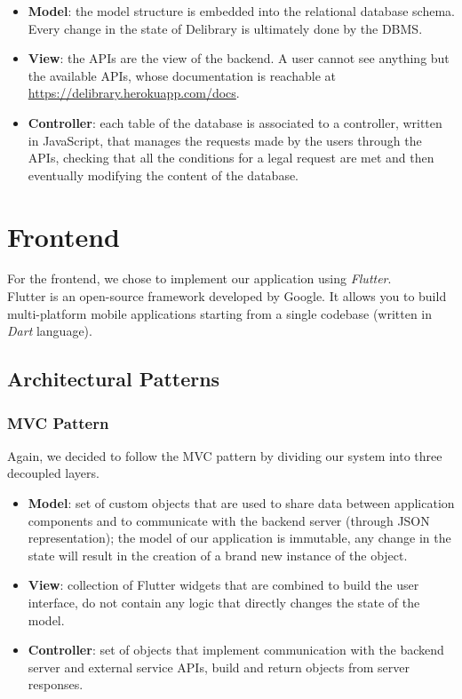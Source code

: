 \begin{itemize}
      \item \textbf{Model}:
            the model structure is embedded into the relational database schema.
            Every change in the state of Delibrary is ultimately done by the DBMS.
      \item \textbf{View}:
            the APIs are the view of the backend. A user cannot see anything but the available APIs, whose documentation is reachable at \href{https://delibrary.herokuapp.com/docs/}{https://delibrary.herokuapp.com/docs}.
      \item \textbf{Controller}:
            each table of the database is associated to a controller, written in JavaScript, that manages the requests made by the users through the APIs, checking that all the conditions for a legal request are met and then eventually modifying the content of the database.
\end{itemize}

\section{Frontend}
For the frontend, we chose to implement our application using \emph{Flutter}.\\
Flutter is an open-source framework developed by Google.
It allows you to build multi-platform mobile applications starting from a single codebase (written in \emph{Dart} language).

\subsection{Architectural Patterns}

\subsubsection{MVC Pattern}
Again, we decided to follow the MVC pattern by dividing our system into three decoupled layers.
\begin{itemize}
      \item \textbf{Model}:
            set of custom objects that are used to share data between application components and to communicate with the backend server (through JSON representation);
            the model of our application is immutable, any change in the state will result in the creation of a brand new instance of the object.
      \item \textbf{View}:
            collection of Flutter widgets that are combined to build the user interface, do not contain any logic that directly changes the state of the model.
      \item \textbf{Controller}:
            set of objects that implement communication with the backend server and external service APIs, build and return objects from server responses.
\end{itemize}

